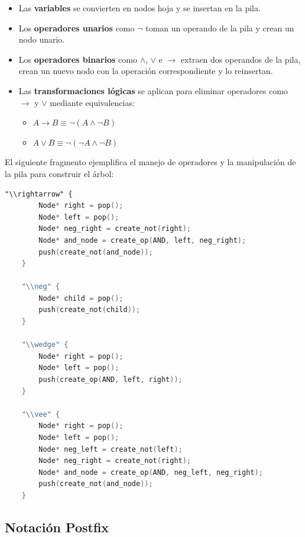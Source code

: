 \documentclass{report}
\begin{document}
	\begin{itemize}
		\item Las \textbf{variables} se convierten en nodos hoja y se insertan en la pila.
		\item Los \textbf{operadores unarios} como $\neg$ toman un operando de la pila y crean un nodo unario.
		\item Los \textbf{operadores binarios} como $\wedge$, $\vee$ e $\rightarrow$ extraen dos operandos de la pila, crean un nuevo nodo con la operaci\'on correspondiente y lo reinsertan.
		\item Las \textbf{transformaciones l\'ogicas} se aplican para eliminar operadores como $\rightarrow$ y $\vee$ mediante equivalencias:
		\begin{itemize}
			\item $A \rightarrow B \equiv \neg (A \wedge \neg B)$
			\item $A \vee B \equiv \neg (\neg A \wedge \neg B)$
		\end{itemize}
	\end{itemize}

	El siguiente fragmento ejemplifica el manejo de operadores y la manipulaci\'on de la pila para construir el \'arbol:

	\begin{lstlisting}[language=Lex, caption={Manejo de pila y reescritura lógica durante la construcción del árbol}]
	"\\rightarrow" {
		Node* right = pop();
		Node* left = pop();
		Node* neg_right = create_not(right);
		Node* and_node = create_op(AND, left, neg_right);
		push(create_not(and_node));
	}

	"\\neg" {
		Node* child = pop();
		push(create_not(child));
	}

	"\\wedge" {
		Node* right = pop();
		Node* left = pop();
		push(create_op(AND, left, right));
	}

	"\\vee" {
		Node* right = pop();
		Node* left = pop();
		Node* neg_left = create_not(left);
		Node* neg_right = create_not(right);
		Node* and_node = create_op(AND, neg_left, neg_right);
		push(create_not(and_node));
	}
	\end{lstlisting}

	\newpage
	\subsection{Notaci\'on Postfix}
\end{document}
